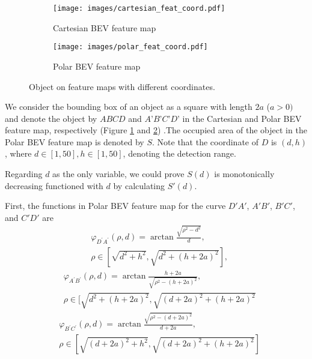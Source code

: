 \documentclass[letterpaper]{article} \usepackage{aaai23}  \usepackage{times}  \usepackage{helvet}  \usepackage{courier}  \usepackage[hyphens]{url}  \usepackage{graphicx} \urlstyle{rm} \def\UrlFont{\rm}  \usepackage{natbib}  \usepackage{caption} \frenchspacing  \setlength{\pdfpagewidth}{8.5in} \setlength{\pdfpageheight}{11in} \usepackage{algorithm}
\begin{document}
\begin{figure*}
     \centering
     \begin{subfigure}[b]{0.425\textwidth}
         \centering
         \texttt{[image: images/cartesian\_feat\_coord.pdf]}
         \caption{Cartesian BEV feature map}
         \label{fig:supp_cartesian_coord}
     \end{subfigure}
     \hfill
     \begin{subfigure}[b]{0.56\textwidth}
         \centering
         \texttt{[image: images/polar\_feat\_coord.pdf]}
         \caption{Polar BEV feature map}
         \label{fig:supp_polar_coord}
     \end{subfigure}
     \caption{Object on feature maps with different coordinates.}
     \label{fig:supp_coord}
\end{figure*} 
We consider the bounding box of an object as a square with length $2a$ ($a>0)$ and denote the object by $ABCD$ and $A’B’C’D’$  in the Cartesian and Polar BEV feature map, respectively (Figure \ref{fig:supp_cartesian_coord} and \ref{fig:supp_polar_coord}) .The occupied area of the object in the Polar BEV feature map is denoted by $S$. Note that the coordinate of $D$ is $(d, h)$, where $d\in[1,50], h\in[1, 50]$, denoting the detection range.

Regarding $d$ as the only variable, we could  prove $S(d)$ is monotonically decreasing functioned with $d$ by calculating $S'(d)$. 

First, the functions in  Polar BEV feature map for the curve $D'A'$, $A'B'$, $B'C'$, and $C'D'$ are
\begin{equation}
\begin{split}
    &\varphi_{D^{\prime}A^{\prime}}(\rho,d)=\arctan\frac{\sqrt{\rho^2-d^2}}{d},\\
    &\rho\in[\sqrt{d^2+h^2},\sqrt{d^2+(h+2a)^2} ],
\end{split}
\end{equation}
\begin{equation}
\begin{split}
    &\varphi_{A^{\prime}B^{\prime}}(\rho,d)=\arctan\frac{h+2a}{\sqrt{\rho^2-(h+2a)^2}},\\
    &\rho\in[\sqrt{d^2+(h+2a)^2},\sqrt{(d+2a)^2+(h+2a)^2}
\end{split}
\end{equation}
\begin{equation}
\begin{split}
    &\varphi_{B^{\prime}C^{\prime}}(\rho,d)=\arctan\frac{\sqrt{\rho^2-(d+2a)^2}}{d+2a},\\
    &\rho\in[\sqrt{(d+2a)^2+h^2},\sqrt{(d+2a)^2+(h+2a)^2}]
\end{split}
\end{equation}
\end{document}
